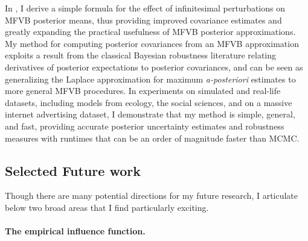 In \citet{giordano:2015:linear, giordano:2018:covariances}, I derive a simple
formula for the effect of infinitesimal perturbations on MFVB posterior means,
thus providing improved covariance estimates and greatly expanding the practical
usefulness of MFVB posterior approximations. My method for computing posterior
covariances from an MFVB approximation exploits a result from the classical
Bayesian robustness literature relating derivatives of posterior expectations to
posterior covariances, and can be seen as generalizing the Laplace approximation
for maximum \emph{a-posteriori} estimates to more general MFVB procedures.
In experiments on simulated and real-life datasets,  including models from
ecology, the social sciences,
and on a massive internet advertising dataset, I
demonstrate that my method is simple, general, and fast, providing accurate
posterior uncertainty estimates and robustness measures with runtimes that can
be an order of magnitude faster than MCMC.



\subsection*{Selected Future work}


Though there are many potential directions for my future research, I articulate
below two broad areas that I find particularly exciting.

\paragraph{The empirical influence function.}


